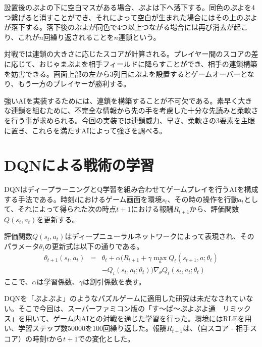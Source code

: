 \documentclass[twocolumn, a4paper]{UECIEresume}
\begin{document}
設置後のぷよの下に空白マスがある場合、ぷよは下へ落下する。同色のぷよを4つ繋げると消すことができ、それによって空白が生まれた場合にはその上のぷよが落下する。落下後のぷよが同色で4つ以上つながる場合には再び消去が起こり、これが$n$回繰り返されることを$n$連鎖という。

対戦では連鎖の大きさに応じたスコアが計算される。プレイヤー間のスコアの差に応じて、おじゃまぷよを相手フィールドに降らすことができ、相手の連鎖構築を妨害できる。画面上部の左から3列目にぷよを設置するとゲームオーバーとなり、もう一方のプレイヤーが勝利する。

強いAIを実装するためには、連鎖を構築することが不可欠である。素早く大きな連鎖を組むために、不完全な情報から先の手を考慮した十分な先読みと柔軟さを行う事が求められる。今回の実装では連鎖威力、早さ、柔軟さの3要素を主眼に置き、これらを満たすAIによって強さを調べる。

\section{DQNによる戦術の学習}
DQN\cite{dqn}はディープラーニングとQ学習を組み合わせてゲームプレイを行うAIを構成する手法である。時刻$t$におけるゲーム画面を環境$s_t$、その時の操作を行動$a_t$として、それによって得られた次の時点$t+1$における報酬$R_{t+1}$から、評価関数$Q(s_t, a_t)$を更新する。

評価関数$Q(s_t, a_t)$はディープニューラルネットワークによって表現され、そのパラメータ$\theta_{t}$の更新式は以下の通りである。
\begin{eqnarray}
\theta_{t+1}(s_t, a_t) & = & \theta_t + \alpha (R_{t+1} + \gamma \max_a Q_t(s_{t+1}, a; \theta_t) \nonumber\\
& & - Q_t(s_t, a_t; \theta_t))\nabla_\theta Q_t(s_t, a_t; \theta_t)
\end{eqnarray}
ここで、$\alpha$は学習係数、$\gamma$は割引係数を表す。


DQNを「ぷよぷよ」のようなパズルゲームに適用した研究は未だなされていない。そこで今回は、スーパーファミコン版の「す〜ぱ〜ぷよぷよ通　リミックス」を用いて、ゲーム内AIとの対戦を通じた学習を行った。環境にはRLE\cite{RLE}を用い、学習ステップ数50000を100回繰り返した。報酬$R_{t+1}$は、（自スコア - 相手スコア）の時刻$t$から$t+1$での変化とした。
\end{document}
